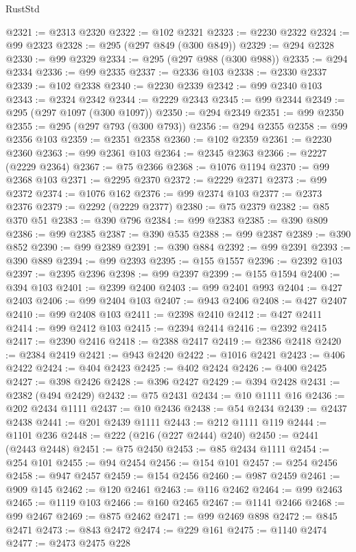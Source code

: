 \begin{lexlean}{RustStd}
\begin{coremodule}
{\begin{coremodule}
{{{{{{{{{{{{{{{{{{{{{{{{{{{{{{{{{@2321 := @2313 @2320
@2322 := @102 @2321
@2323 := @2230 @2322
@2324 := @99 @2323
@2328 := @295 (@297 @849 (@300 @849))
@2329 := @294 @2328
@2330 := @99 @2329
@2334 := @295 (@297 @988 (@300 @988))
@2335 := @294 @2334
@2336 := @99 @2335
@2337 := @2336 @103
@2338 := @2330 @2337
@2339 := @102 @2338
@2340 := @2230 @2339
@2342 := @99 @2340 @103
@2343 := @2324 @2342
@2344 := @2229 @2343
@2345 := @99 @2344
@2349 := @295 (@297 @1097 (@300 @1097))
@2350 := @294 @2349
@2351 := @99 @2350
@2355 := @295 (@297 @793 (@300 @793))
@2356 := @294 @2355
@2358 := @99 @2356 @103
@2359 := @2351 @2358
@2360 := @102 @2359
@2361 := @2230 @2360
@2363 := @99 @2361 @103
@2364 := @2345 @2363
@2366 := @2227 (@2229 @2364)
@2367 := @75 @2366
@2368 := @1076 @1194
@2370 := @99 @2368 @103
@2371 := @2295 @2370
@2372 := @2229 @2371
@2373 := @99 @2372
@2374 := @1076 @162
@2376 := @99 @2374 @103
@2377 := @2373 @2376
@2379 := @2292 (@2229 @2377)
@2380 := @75 @2379
@2382 := @85 @370 @51
@2383 := @390 @796
@2384 := @99 @2383
@2385 := @390 @809
@2386 := @99 @2385
@2387 := @390 @535
@2388 := @99 @2387
@2389 := @390 @852
@2390 := @99 @2389
@2391 := @390 @884
@2392 := @99 @2391
@2393 := @390 @889
@2394 := @99 @2393
@2395 := @155 @1557
@2396 := @2392 @103
@2397 := @2395 @2396
@2398 := @99 @2397
@2399 := @155 @1594
@2400 := @394 @103
@2401 := @2399 @2400
@2403 := @99 @2401 @993
@2404 := @427 @2403
@2406 := @99 @2404 @103
@2407 := @943 @2406
@2408 := @427 @2407
@2410 := @99 @2408 @103
@2411 := @2398 @2410
@2412 := @427 @2411
@2414 := @99 @2412 @103
@2415 := @2394 @2414
@2416 := @2392 @2415
@2417 := @2390 @2416
@2418 := @2388 @2417
@2419 := @2386 @2418
@2420 := @2384 @2419
@2421 := @943 @2420
@2422 := @1016 @2421
@2423 := @406 @2422
@2424 := @404 @2423
@2425 := @402 @2424
@2426 := @400 @2425
@2427 := @398 @2426
@2428 := @396 @2427
@2429 := @394 @2428
@2431 := @2382 (@494 @2429)
@2432 := @75 @2431
@2434 := @10 @1111 @16
@2436 := @202 @2434 @1111
@2437 := @10 @2436
@2438 := @54 @2434
@2439 := @2437 @2438
@2441 := @201 @2439 @1111
@2443 := @212 @1111 @119
@2444 := @1101 @236
@2448 := @222 (@216 (@227 @2444) @240)
@2450 := @2441 (@2443 @2448)
@2451 := @75 @2450
@2453 := @85 @2434 @1111
@2454 := @254 @101
@2455 := @94 @2454
@2456 := @154 @101
@2457 := @254 @2456
@2458 := @947 @2457
@2459 := @154 @2456
@2460 := @987 @2459
@2461 := @909 @145
@2462 := @120 @2461
@2463 := @116 @2462
@2464 := @99 @2463
@2465 := @1119 @103
@2466 := @160 @2465
@2467 := @1141 @2466
@2468 := @99 @2467
@2469 := @875 @2462
@2471 := @99 @2469 @898
@2472 := @845 @2471
@2473 := @843 @2472
@2474 := @229 @161
@2475 := @1140 @2474
@2477 := @2473 @2475 @228
}}}}}}}}}}}}}}}}}}}}}}}}}}}}}}}}}
\end{coremodule}}
\end{coremodule}
\end{lexlean}
